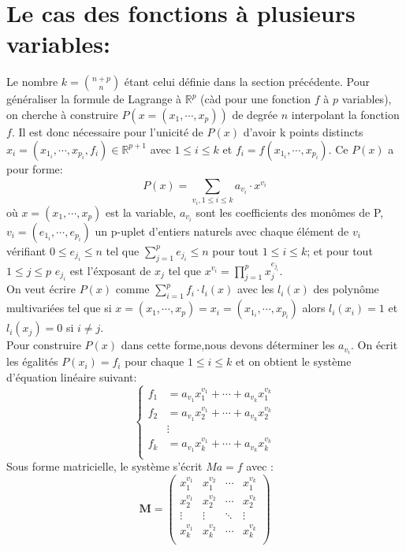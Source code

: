 \documentclass[a4paper,12pt]{article}
\begin{document}
\section{Le cas des fonctions à plusieurs variables:}
Le nombre $k=\binom{n+p}{n}$ étant celui définie dans la section précédente.
Pour généraliser la formule de Lagrange à $\mathbb{R}^p$ (càd pour une fonction $f$ à $p$ variables), on cherche à construire $P(x=(x_1,\cdots,x_p))$ de degrée $n$ interpolant la fonction $f$. Il est donc nécessaire pour l'unicité de $P(x)$ d'avoir k points distincts $x_i = (x_{1_i},\cdots,x_{p_i},f_i) \in \mathbb{R}^{p+1}$ avec $1 \leq i \leq k$ et $f_i=f(x_{1_i},\cdots,x_{p_i})$. Ce $P(x)$ a pour forme:
\begin{equation}
	P(x)=\sum_{v_i, 1 \leq i \leq k }^{} a_{v_i} \cdot x^{v_i}
\end{equation}
où  $x=(x_1, \cdots,x_p)$ est la variable, $a_{v_i}$ sont les coefficients des monômes de P, $v_i=(e_{1_i}, \cdots,e_{p_i})$ un p-uplet d'entiers naturels avec chaque élément de $v_i$ vérifiant $0 \leq e_{j_i} \leq n$ tel que $\sum_{j=1}^{p}e_{j_i} \leq n$ pour tout $1\leq i\leq k$; et pour tout $1 \leq j \leq p$   $e_{j_i}$ est l'éxposant de $x_j$ tel que $x^{v_i}=\prod_{j=1}^{p}x_j^{e_{j_i}}$.\\
On veut écrire $P(x)$ comme $\sum_{i=1}^{p}f_i\cdot l_i(x)$ avec les $l_i(x)$ des polynôme multivariées tel que si $x = (x_1,\cdots ,x_p) = x_i = (x_{1_i},\cdots ,x_{p_i})$ alors $l_i(x_i) = 1$ et $l_i(x_j) = 0$ si $i \neq j$.\\
Pour construire $P(x)$ dans cette forme,nous devons déterminer les $a_{v_i}$. On écrit les égalités $P(x_i) = f_i$ pour chaque $1 \leq i \leq k$ et on obtient le système d'équation linéaire suivant:
\[
\begin{cases}
	f_1 &= a_{v_1} x_1^{v_1} + \cdots + a_{v_k} x_1^{v_k}\\
    f_2 &= a_{v_1} x_2^{v_1} + \cdots + a_{v_k} x_2^{v_k}\\
   		&\vdots \\
    f_k &= a_{v_1} x_k^{v_1} + \cdots + a_{v_k} x_k^{v_k}\\
\end{cases}
\]
Sous forme matricielle, le système s'écrit $Ma=f$ avec :
\[
\mathbf{M} =\begin{pmatrix}
	x_1^{v_1} & x_1^{v_2} & \cdots & x_1^{v_k}\\
    x_2^{v_1} & x_2^{v_2} & \cdots & x_2^{v_k}\\
    \vdots & \vdots & \ddots & \vdots \\
    x_k^{v_1} & x_k^{v_2} & \cdots & x_k^{v_k}\\
   \end{pmatrix}
\]
\end{document}
